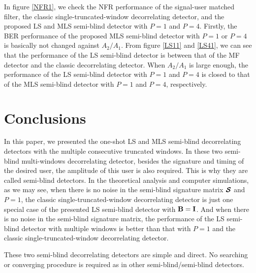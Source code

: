 \documentclass[a4paper,10pt,fleqn, twocolumn]{IEEETran}
\newcommand{\bI}{{\bf I}}
\newcommand{\bB}{{\bf B}}
\newcommand{\bcS}{{\mbox {\boldmath ${\cal S}$}}}
\begin{document}
In figure \ref{NFR1}, we check the NFR performance of the
signal-user matched filter, the classic single-truncated-window
decorrelating detector, and the proposed LS  and MLS semi-blind
detector with $P=1$ and $P=4$. Firstly, the BER performance of the
proposed MLS semi-blind detector with $P=1$ or $P=4$ is basically
not changed against $A_2/A_1$. From figure \ref{LS11} and
\ref{LS41}, we can see that the performance of the LS semi-blind
detector is between that of the MF detector and the classic
decorrelating detector. When $A_2/A_1$ is large enough, the
performance of the LS semi-blind detector with $P=1$ and $P=4$ is
closed to that of the MLS semi-blind detector with $P=1$ and
$P=4$, respectively.

\section{Conclusions}

In this paper, we presented the one-shot LS and MLS semi-blind
decorrelating detectors with the multiple consecutive truncated
windows. In these two semi-blind multi-windows decorrelating
detector, besides the signature and timing of the desired user,
the amplitude of this user is also required. This is why they are
called semi-blind detectors. In the theoretical analysis and
computer simulations, as we may see, when there is no noise in the
semi-blind signature matrix $\bcS$ and $P=1$, the classic
single-truncated-window decorrelating detector is just one special
case of the presented LS semi-blind detector with $\bB=\bI$. And
when there is no noise in the semi-blind signature matrix, the
performance of the LS semi-blind detector with multiple windows is
better than that with $P=1$ and the classic
single-truncated-window decorrelating detector.

These two semi-blind decorrelating detectors are simple and
direct. No searching or converging procedure is required as in
other semi-blind/semi-blind detectors.



\end{document}
